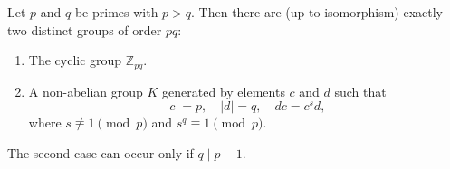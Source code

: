 Let $p$ and $q$ be primes with $p > q$. Then there are (up to isomorphism) exactly two distinct groups of order $pq$:
\begin{enumerate}
\item The cyclic group $\mathbb{Z}_{pq}$.
\item A non-abelian group $K$ generated by elements $c$ and $d$ such that
$$|c| = p, \quad |d| = q, \quad dc = c^s d,$$
where $s \not\equiv 1 \pmod{p}$ and $s^q \equiv 1 \pmod{p}$.
\end{enumerate}
The second case can occur only if $q \mid p-1$.
